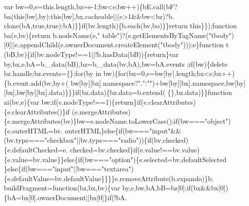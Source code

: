 \begin{DoxyCode}
{      var bw=0,e=this.length,bz=e-1;bw<e;bw++)\{bE.call(bF?ba(\textcolor{keyword}{this}[bw],by):\textcolor{keyword}{this}[bw],bx.cacheable||(e>1&&bw<bz)?b.
      clone(bA,\textcolor{keyword}{true},\textcolor{keyword}{true}):bA)\}\}\textcolor{keywordflow}{if}(bv.length)\{b.each(bv,bo)\}\}\textcolor{keywordflow}{return} \textcolor{keyword}{this}\}\});\textcolor{keyword}{function} ba(e,bv)\{\textcolor{keywordflow}{return} b.nodeName(e,\textcolor{stringliteral}{"
      table"})?(e.getElementsByTagName(\textcolor{stringliteral}{"tbody"})[0]||e.appendChild(e.ownerDocument.createElement(\textcolor{stringliteral}{"tbody"}))):e\}\textcolor{keyword}{function} t
      (bB,bv)\{\textcolor{keywordflow}{if}(bv.nodeType!==1||!b.hasData(bB))\{\textcolor{keywordflow}{return}\}var by,bx,e,bA=b.\_data(bB),bz=b.\_data(bv,bA),bw=bA.events
      ;\textcolor{keywordflow}{if}(bw)\{\textcolor{keyword}{delete} bz.handle;bz.events=\{\};\textcolor{keywordflow}{for}(by in bw)\{\textcolor{keywordflow}{for}(bx=0,e=bw[by].length;bx<e;bx++)\{b.event.add(bv,by+(
      bw[by][bx].\textcolor{keyword}{namespace}?\textcolor{stringliteral}{"."}:\textcolor{stringliteral}{""})+bw[by][bx].\textcolor{keyword}{namespace},bw[by][bx],bw[by][bx].data)\}\}\}\textcolor{keywordflow}{if}(bz.data)\{bz.data=b.extend(
      \{\},bz.data)\}\}\textcolor{keyword}{function} ai(bv,e)\{var bw;\textcolor{keywordflow}{if}(e.nodeType!==1)\{\textcolor{keywordflow}{return}\}\textcolor{keywordflow}{if}(e.clearAttributes)\{e.clearAttributes()\}\textcolor{keywordflow}{if}
      (e.mergeAttributes)\{e.mergeAttributes(bv)\}bw=e.nodeName.toLowerCase();\textcolor{keywordflow}{if}(bw===\textcolor{stringliteral}{"object"})\{e.outerHTML=bv.
      outerHTML\}\textcolor{keywordflow}{else}\{\textcolor{keywordflow}{if}(bw===\textcolor{stringliteral}{"input"}&&(bv.type===\textcolor{stringliteral}{"checkbox"}||bv.type===\textcolor{stringliteral}{"radio"}))\{\textcolor{keywordflow}{if}(bv.checked)\{e.defaultChecked=e.
      checked=bv.checked\}\textcolor{keywordflow}{if}(e.value!==bv.value)\{e.value=bv.value\}\}\textcolor{keywordflow}{else}\{\textcolor{keywordflow}{if}(bw===\textcolor{stringliteral}{"option"})\{e.selected=bv.defaultSelected
      \}\textcolor{keywordflow}{else}\{\textcolor{keywordflow}{if}(bw===\textcolor{stringliteral}{"input"}||bw===\textcolor{stringliteral}{"textarea"})\{e.defaultValue=bv.defaultValue\}\}\}\}e.removeAttribute(b.expando)\}b.
      buildFragment=\textcolor{keyword}{function}(bz,bx,bv)\{var by,e,bw,bA,bB=bz[0];\textcolor{keywordflow}{if}(bx&&bx[0])\{bA=bx[0].ownerDocument||bx[0]\}\textcolor{keywordflow}{if}(!bA.
}
\end{DoxyCode}
